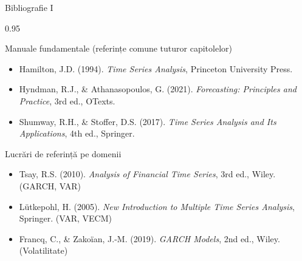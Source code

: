 \documentclass[9pt, aspectratio=169, t]{beamer}
\begin{document}
\begin{frame}{Bibliografie I}
    \vspace{-0.3cm}
    \begin{cminipage}{0.95\textwidth}
        \begin{block}{Manuale fundamentale (referințe comune tuturor capitolelor)}
            {\small
            \begin{itemize}\setlength{\itemsep}{0pt}
                \item Hamilton, J.D. (1994). \textit{Time Series Analysis}, Princeton University Press.
                \item Hyndman, R.J., \& Athanasopoulos, G. (2021). \textit{Forecasting: Principles and Practice}, 3rd ed., OTexts.
                \item Shumway, R.H., \& Stoffer, D.S. (2017). \textit{Time Series Analysis and Its Applications}, 4th ed., Springer.
            \end{itemize}
            }
        \end{block}

        \begin{exampleblock}{Lucrări de referință pe domenii}
            {\small
            \begin{itemize}\setlength{\itemsep}{0pt}
                \item Tsay, R.S. (2010). \textit{Analysis of Financial Time Series}, 3rd ed., Wiley. (GARCH, VAR)
                \item Lütkepohl, H. (2005). \textit{New Introduction to Multiple Time Series Analysis}, Springer. (VAR, VECM)
                \item Francq, C., \& Zakoïan, J.-M. (2019). \textit{GARCH Models}, 2nd ed., Wiley. (Volatilitate)
            \end{itemize}
            }
        \end{exampleblock}
    \end{cminipage}
\end{frame}
\end{document}
